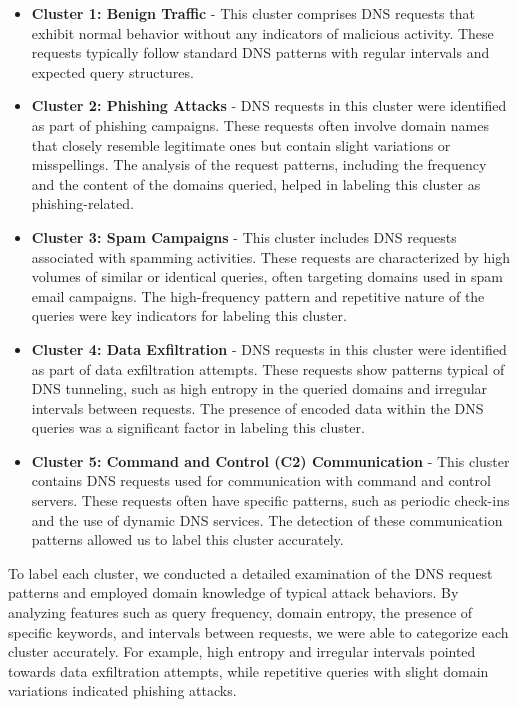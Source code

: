 \begin{itemize}
    \item \textbf{Cluster 1: Benign Traffic} - This cluster comprises DNS requests that exhibit normal behavior without any indicators of malicious activity. These requests typically follow standard DNS patterns with regular intervals and expected query structures.

    \item \textbf{Cluster 2: Phishing Attacks} - DNS requests in this cluster were identified as part of phishing campaigns. These requests often involve domain names that closely resemble legitimate ones but contain slight variations or misspellings. The analysis of the request patterns, including the frequency and the content of the domains queried, helped in labeling this cluster as phishing-related.

    \item \textbf{Cluster 3: Spam Campaigns} - This cluster includes DNS requests associated with spamming activities. These requests are characterized by high volumes of similar or identical queries, often targeting domains used in spam email campaigns. The high-frequency pattern and repetitive nature of the queries were key indicators for labeling this cluster.

    \item \textbf{Cluster 4: Data Exfiltration} - DNS requests in this cluster were identified as part of data exfiltration attempts. These requests show patterns typical of DNS tunneling, such as high entropy in the queried domains and irregular intervals between requests. The presence of encoded data within the DNS queries was a significant factor in labeling this cluster.

    \item \textbf{Cluster 5: Command and Control (C2) Communication} - This cluster contains DNS requests used for communication with command and control servers. These requests often have specific patterns, such as periodic check-ins and the use of dynamic DNS services. The detection of these communication patterns allowed us to label this cluster accurately.
\end{itemize}

To label each cluster, we conducted a detailed examination of the DNS request patterns and employed domain knowledge of typical attack behaviors. By analyzing features such as query frequency, domain entropy, the presence of specific keywords, and intervals between requests, we were able to categorize each cluster accurately. For example, high entropy and irregular intervals pointed towards data exfiltration attempts, while repetitive queries with slight domain variations indicated phishing attacks.

